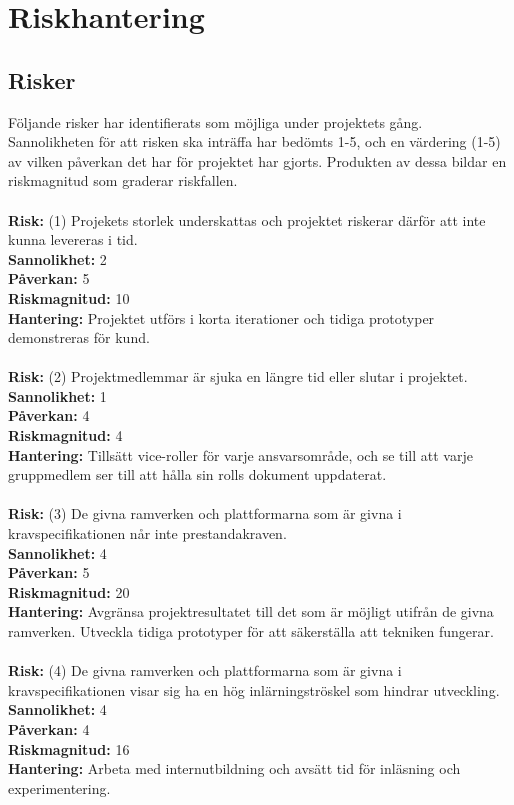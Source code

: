 \section{Riskhantering}
\subsection{Risker} 
Följande risker har identifierats som möjliga under projektets gång. Sannolikheten för att risken ska inträffa har bedömts 1-5, och en värdering (1-5) av vilken påverkan det har för projektet har gjorts. Produkten av dessa bildar en riskmagnitud som graderar riskfallen.
\\
\\
\textbf{Risk: } (1) Projekets storlek underskattas och projektet riskerar därför att inte kunna levereras i tid. \\
\textbf{Sannolikhet: } 2	\\
\textbf{Påverkan: }	5		\\
\textbf{Riskmagnitud: } 10	\\
\textbf{Hantering:} Projektet utförs i korta iterationer och tidiga prototyper demonstreras för kund. 
\\
\\
\textbf{Risk: } (2) Projektmedlemmar är sjuka en längre tid eller slutar i projektet. \\
\textbf{Sannolikhet: } 1	\\
\textbf{Påverkan: }	4		\\
\textbf{Riskmagnitud: } 4	\\
\textbf{Hantering:} Tillsätt vice-roller för varje ansvarsområde, och se till att varje gruppmedlem ser till att hålla sin rolls dokument uppdaterat. 
\\
\\
\textbf{Risk: } (3) De givna ramverken och plattformarna som är givna i kravspecifikationen når inte prestandakraven. \\
\textbf{Sannolikhet: } 4	\\
\textbf{Påverkan: }	5		\\
\textbf{Riskmagnitud: } 20	\\
\textbf{Hantering:} Avgränsa projektresultatet till det som är möjligt utifrån de givna ramverken. Utveckla tidiga prototyper för att säkerställa att tekniken fungerar. \\
\\
\textbf{Risk: } (4) De givna ramverken och plattformarna som är givna i kravspecifikationen visar sig ha en hög inlärningströskel som hindrar utveckling.\\
\textbf{Sannolikhet: } 4	\\
\textbf{Påverkan: }	4		\\
\textbf{Riskmagnitud: } 16	\\
\textbf{Hantering:} Arbeta med internutbildning och avsätt tid för inläsning och experimentering. 
